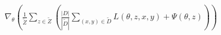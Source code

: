 \documentclass[preview]{standalone}
\begin{document}
\begin{align*}
\nabla_{\theta} \left(\frac{1}{\tilde Z} \sum_{z \in \tilde Z} \left( \frac{|D|}{|\tilde D |} \sum_{(x,y) \in \tilde D} L (\theta, z, x, y) + \Psi (\theta, z) \right) \right)
\end{align*}
\end{document}
